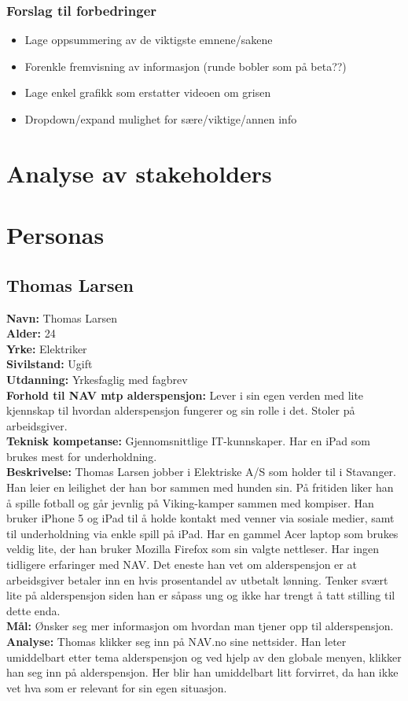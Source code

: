 \documentclass[informationsecurity]{gucmasterproject}
\begin{document}
\subsubsection{Forslag til forbedringer}
\begin{itemize}
\item Lage oppsummering av de viktigste emnene/sakene
\item Forenkle fremvisning av informasjon (runde bobler som på beta??)
\item Lage enkel grafikk som erstatter videoen om grisen
\item Dropdown/expand mulighet for sære/viktige/annen info
\end{itemize}



\section{Analyse av stakeholders}




\section{Personas}
\subsection{Thomas Larsen}
\textbf{Navn:} Thomas Larsen \\
\textbf{Alder:} 24 \\
\textbf{Yrke:} Elektriker \\
\textbf{Sivilstand:} Ugift \\
\textbf{Utdanning:} Yrkesfaglig med fagbrev \\
\textbf{Forhold til NAV mtp alderspensjon:} Lever i sin egen verden med lite kjennskap til hvordan alderspensjon fungerer og sin rolle i det. Stoler på arbeidsgiver. \\
\textbf{Teknisk kompetanse:} Gjennomsnittlige IT-kunnskaper. Har en iPad som brukes mest for underholdning.  \\
\textbf{Beskrivelse:} Thomas Larsen jobber i Elektriske A/S som holder til i Stavanger. Han leier en leilighet der han bor sammen med hunden sin. På fritiden liker han å spille fotball og går jevnlig på Viking-kamper sammen med kompiser. Han bruker iPhone 5 og iPad til å holde kontakt med venner via sosiale medier, samt til underholdning via enkle spill på iPad. Har en gammel Acer laptop som brukes veldig lite, der han bruker Mozilla Firefox som sin valgte nettleser. Har ingen tidligere erfaringer med NAV. Det eneste han vet om alderspensjon er at arbeidsgiver betaler inn en hvis prosentandel av utbetalt lønning. Tenker svært lite på alderspensjon siden han er såpass ung og ikke har trengt å tatt stilling til dette enda. \\
\textbf{Mål:} Ønsker seg mer informasjon om hvordan man tjener opp til alderspensjon.  \\
\textbf{Analyse:} Thomas klikker seg inn på NAV.no sine nettsider. Han leter umiddelbart etter tema alderspensjon og ved hjelp av den globale menyen, klikker han seg inn på alderspensjon. Her blir han umiddelbart litt forvirret, da han ikke vet hva som er relevant for sin egen situasjon.
\end{document}
